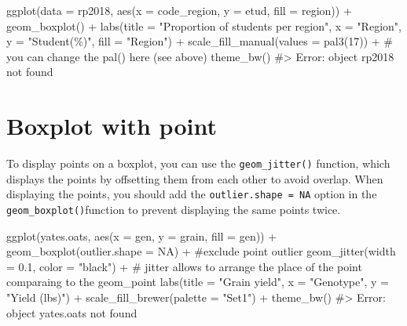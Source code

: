 \documentclass[
  letterpaper,
  DIV=11,
  numbers=noendperiod]{scrreprt}
\newenvironment{Shaded}{\begin{snugshade}}{\end{snugshade}}
\newcommand{\AttributeTok}[1]{\textcolor[rgb]{0.40,0.45,0.13}{#1}}
\newcommand{\CommentTok}[1]{\textcolor[rgb]{0.37,0.37,0.37}{#1}}
\newcommand{\ConstantTok}[1]{\textcolor[rgb]{0.56,0.35,0.01}{#1}}
\newcommand{\DecValTok}[1]{\textcolor[rgb]{0.68,0.00,0.00}{#1}}
\newcommand{\FloatTok}[1]{\textcolor[rgb]{0.68,0.00,0.00}{#1}}
\newcommand{\FunctionTok}[1]{\textcolor[rgb]{0.28,0.35,0.67}{#1}}
\newcommand{\NormalTok}[1]{\textcolor[rgb]{0.00,0.23,0.31}{#1}}
\newcommand{\SpecialCharTok}[1]{\textcolor[rgb]{0.37,0.37,0.37}{#1}}
\newcommand{\StringTok}[1]{\textcolor[rgb]{0.13,0.47,0.30}{#1}}
\begin{document}
\begin{Shaded}
\begin{Highlighting}[]
\FunctionTok{ggplot}\NormalTok{(}\AttributeTok{data =}\NormalTok{ rp2018, }\FunctionTok{aes}\NormalTok{(}\AttributeTok{x =}\NormalTok{ code\_region, }\AttributeTok{y =}\NormalTok{ etud, }\AttributeTok{fill =}\NormalTok{ region)) }\SpecialCharTok{+}
  \FunctionTok{geom\_boxplot}\NormalTok{() }\SpecialCharTok{+}
  \FunctionTok{labs}\NormalTok{(}\AttributeTok{title =} \StringTok{"Proportion of students per region"}\NormalTok{, }\AttributeTok{x =} \StringTok{"Region"}\NormalTok{, }\AttributeTok{y =} \StringTok{"Student(\%)"}\NormalTok{, }\AttributeTok{fill =} \StringTok{"Region"}\NormalTok{) }\SpecialCharTok{+} 
  \FunctionTok{scale\_fill\_manual}\NormalTok{(}\AttributeTok{values =} \FunctionTok{pal3}\NormalTok{(}\DecValTok{17}\NormalTok{)) }\SpecialCharTok{+} \CommentTok{\# you can change the pal() here (see above)}
  \FunctionTok{theme\_bw}\NormalTok{()}
\CommentTok{\#\textgreater{} Error: object \textquotesingle{}rp2018\textquotesingle{} not found}
\end{Highlighting}
\end{Shaded}

\section{Boxplot with point}\label{boxplot-with-point}

To display points on a boxplot, you can use the \texttt{geom\_jitter()}
function, which displays the points by offsetting them from each other
to avoid overlap. When displaying the points, you should add the
\texttt{\textquotesingle{}outlier.shape\ =\ NA\textquotesingle{}} option
in the \texttt{geom\_boxplot()}function to prevent displaying the same
points twice.

\begin{Shaded}
\begin{Highlighting}[]
\FunctionTok{ggplot}\NormalTok{(yates.oats, }\FunctionTok{aes}\NormalTok{(}\AttributeTok{x =}\NormalTok{ gen, }\AttributeTok{y =}\NormalTok{ grain, }\AttributeTok{fill =}\NormalTok{ gen)) }\SpecialCharTok{+}
  \FunctionTok{geom\_boxplot}\NormalTok{(}\AttributeTok{outlier.shape =} \ConstantTok{NA}\NormalTok{) }\SpecialCharTok{+} \CommentTok{\#exclude point outlier}
  \FunctionTok{geom\_jitter}\NormalTok{(}\AttributeTok{width =} \FloatTok{0.1}\NormalTok{, }\AttributeTok{color =} \StringTok{"black"}\NormalTok{) }\SpecialCharTok{+} \CommentTok{\# jitter allows to arrange the place of the point comparaing to the geom\_point}
  \FunctionTok{labs}\NormalTok{(}\AttributeTok{title =} \StringTok{"Grain yield"}\NormalTok{, }\AttributeTok{x =} \StringTok{"Genotype"}\NormalTok{, }\AttributeTok{y =} \StringTok{"Yield (lbs)"}\NormalTok{) }\SpecialCharTok{+}
  \FunctionTok{scale\_fill\_brewer}\NormalTok{(}\AttributeTok{palette =} \StringTok{"Set1"}\NormalTok{) }\SpecialCharTok{+}
  \FunctionTok{theme\_bw}\NormalTok{()}
\CommentTok{\#\textgreater{} Error: object \textquotesingle{}yates.oats\textquotesingle{} not found}
\end{Highlighting}
\end{Shaded}
\end{document}
